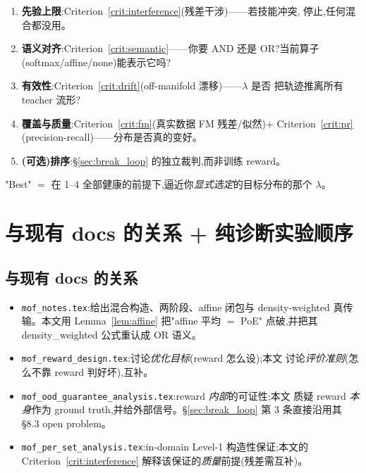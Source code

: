 \documentclass[11pt,a4paper]{article}
\theoremstyle{definition}
\begin{document}
\begin{tcolorbox}[colback=green!5,colframe=green!50!black,title=\textbf{Reward-Free 判据清单(选 $\lambda$ / 选算子时)}]
\begin{enumerate}[leftmargin=1.5em]
\item \textbf{先验上限}:Criterion~\ref{crit:interference}(残差干涉)——若技能冲突,
停止,任何混合都没用。
\item \textbf{语义对齐}:Criterion~\ref{crit:semantic}——你要 AND 还是 OR?当前算子
(softmax/affine/none)能表示它吗?
\item \textbf{有效性}:Criterion~\ref{crit:drift}(off-manifold 漂移)——$\lambda$ 是否
把轨迹推离所有 teacher 流形?
\item \textbf{覆盖与质量}:Criterion~\ref{crit:fm}(真实数据 FM 残差/似然)+
Criterion~\ref{crit:pr}(precision-recall)——分布是否真的变好。
\item \textbf{(可选)排序}:\S\ref{sec:break_loop} 的独立裁判,而非训练 reward。
\end{enumerate}
"Best" $=$ 在 1--4 全部健康的前提下,逼近你\emph{显式选定}的目标分布的那个 $\lambda$。
\end{tcolorbox}

\section{与现有 docs 的关系 + 纯诊断实验顺序}
\label{sec:relation}

\subsection{与现有 docs 的关系}

\begin{itemize}[leftmargin=1.5em]
\item \texttt{mof\_notes.tex}:给出混合构造、两阶段、affine 闭包与
density-weighted 真传输。本文用 Lemma~\ref{lem:affine} 把"affine 平均 $=$ PoE"
点破,并把其 density\_weighted 公式重认成 OR 语义。
\item \texttt{mof\_reward\_design.tex}:讨论\emph{优化目标}(reward 怎么设);本文
讨论\emph{评价准则}(怎么不靠 reward 判好坏),互补。
\item \texttt{mof\_ood\_guarantee\_analysis.tex}:reward \emph{内部}的可证性;本文
质疑 reward \emph{本身}作为 ground truth,并给外部信号。\S\ref{sec:break_loop}
第 3 条直接沿用其 \S8.3 open problem。
\item \texttt{mof\_per\_set\_analysis.tex}:in-domain Level-1 构造性保证;本文的
Criterion~\ref{crit:interference} 解释该保证的\emph{质量}前提(残差需互补)。
\end{itemize}
\end{document}
